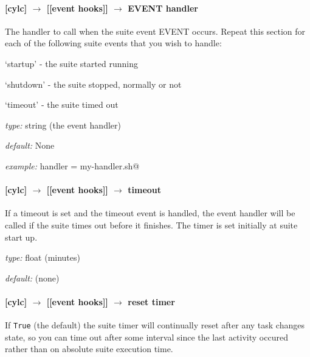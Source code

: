 \paragraph[EVENT handler]{[cylc] $\rightarrow$ [[event hooks]] $\rightarrow$ EVENT handler}

The handler to call when the suite event EVENT occurs. Repeat this
section for each of the following suite events that you wish to handle:
\begin{myitemize}
    \item `startup' - the suite started running 
    \item `shutdown' - the suite stopped, normally or not
    \item `timeout' - the suite timed out
\end{myitemize}

\begin{myitemize}
    \item {\em type:} string (the event handler)
    \item {\em default:} None
    \item {\em example:} \lstinline@startup handler = my-handler.sh@
\end{myitemize}

\paragraph[timeout]{[cylc] $\rightarrow$ [[event hooks]] $\rightarrow$ timeout}

If a timeout is set and the timeout event is handled, the event
handler will be called if the suite times out before it finishes.
The timer is set initially at suite start up. 

\begin{myitemize}
    \item {\em type:} float (minutes)
    \item {\em default:} (none)
\end{myitemize}

\paragraph[reset timer]{[cylc] $\rightarrow$ [[event hooks]] $\rightarrow$ reset timer}

If \lstinline=True= (the default) the suite timer will continually reset
after any task changes state, so you can time out after some interval
since the last activity occured rather than on absolute suite execution
time.

